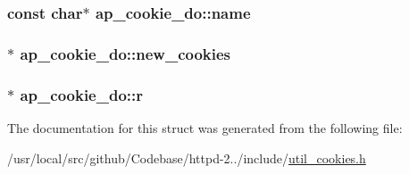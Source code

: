 \subsubsection[{\texorpdfstring{name}{name}}]{\setlength{\rightskip}{0pt plus 5cm}const char$\ast$ ap\+\_\+cookie\+\_\+do\+::name}\hypertarget{structap__cookie__do_a8f60775ec09c55a8f6f5f75feb9c52fc}{}\label{structap__cookie__do_a8f60775ec09c55a8f6f5f75feb9c52fc}
\subsubsection[{\texorpdfstring{new\+\_\+cookies}{new_cookies}}]{$\ast$ ap\+\_\+cookie\+\_\+do\+::new\+\_\+cookies}\hypertarget{structap__cookie__do_a4142e77631074973b28c9f377d1ece7b}{}\label{structap__cookie__do_a4142e77631074973b28c9f377d1ece7b}
\subsubsection[{\texorpdfstring{r}{r}}]{$\ast$ ap\+\_\+cookie\+\_\+do\+::r}\hypertarget{structap__cookie__do_aa698d250280da6b18ab9cf1a959fed2f}{}\label{structap__cookie__do_aa698d250280da6b18ab9cf1a959fed2f}


The documentation for this struct was generated from the following file\+:\begin{DoxyCompactItemize}
\item 
/usr/local/src/github/\+Codebase/httpd-\/2../include/\hyperlink{util__cookies_8h}{util\+\_\+cookies.\+h}\end{DoxyCompactItemize}
